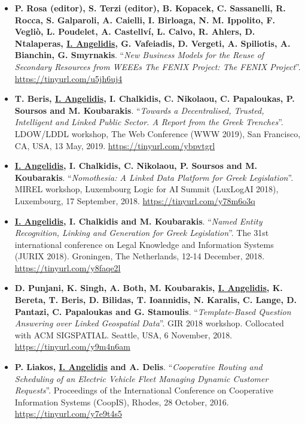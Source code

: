 \documentclass[a4paper,oneside,10pt]{article}
\begin{document}
\begin{itemize}

\item \textbf{P. Rosa (editor), S. Terzi (editor), B. Kopacek, C. Sassanelli, R. Rocca, S. Galparoli, A. Caielli, I. Birloaga, N. M. Ippolito, F. Vegliò, L. Poudelet, A. Castellví, L. Calvo, R. Ahlers, D. Ntalaperas, \underline{I. Angelidis}, G. Vafeiadis, D. Vergeti, A. Spiliotis, A. Bianchin, G. Smyrnakis}. ``\textit{New Business Models for the Reuse of Secondary Resources from WEEEs The FENIX Project: The FENIX Project}''. \url{https://tinyurl.com/u5jh6uj4}

\item \textbf{T. Beris, \underline{I. Angelidis}, I. Chalkidis, C. Nikolaou, C. Papaloukas, P. Soursos and M. Koubarakis}. ``\textit{Towards a Decentralised, Trusted, Intelligent and Linked Public Sector. A Report from the Greek Trenches}''. LDOW/LDDL workshop, The Web Conference (WWW 2019), San Francisco, CA, USA, 13 May, 2019. \url{https://tinyurl.com/ybpvtgrl}

\item \textbf{\underline{I. Angelidis}, I. Chalkidis, C. Nikolaou, P. Soursos and M. Koubarakis}. ``\textit{Nomothesia: A Linked Data Platform for Greek Legislation}''. MIREL workshop, Luxembourg Logic for AI Summit (LuxLogAI 2018), Luxembourg, 17 September, 2018. \url{https://tinyurl.com/y78m6o3q}

\item \textbf{\underline{I. Angelidis}, I. Chalkidis and M. Koubarakis}. ``\textit{Named Entity Recognition, Linking and Generation for Greek Legislation}''. The 31st international conference on Legal Knowledge and Information Systems (JURIX 2018). Groningen, The Netherlands, 12-14 December‚ 2018. \url{https://tinyurl.com/y8faqe2l}

\item \textbf{D. Punjani, K. Singh, A. Both, M. Koubarakis, \underline{I. Angelidis}, K. Bereta, T. Beris, D. Bilidas, T. Ioannidis, N. Karalis, C. Lange, D. Pantazi, C. Papaloukas and G. Stamoulis}. ``\textit{Template-Based Question Answering over Linked Geospatial Data}''. GIR 2018 workshop. Collocated with ACM SIGSPATIAL. Seattle, USA, 6 November, 2018. \url{https://tinyurl.com/y9m4n6am}

\item \textbf{P. Liakos, \underline{I. Angelidis} and A. Delis}. ``\textit{Cooperative Routing and Scheduling of an Electric Vehicle Fleet Managing Dynamic Customer Requests}''. Proceedings of the International Conference on Cooperative Information Systems (CoopIS), Rhodes, 28 October, 2016. \url{https://tinyurl.com/y7e9t4s5}

\end{itemize}
\end{document}
